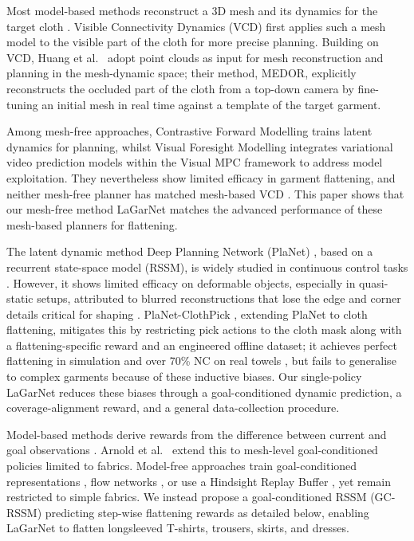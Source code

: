 \documentclass[journal]{IEEEtran}
\newif\ifshowrev\showrevtrue
\newcommand{\rev}[1]{\ifshowrev\textcolor{revblue}{#1}\else#1\fi}
\newif\ifshowirev\showirevtrue
\newcommand{\irev}[1]{\ifshowirev\textcolor{irevgreen}{#1}\else#1\fi}
\begin{document}
\rev{Most model-based methods reconstruct a 3D mesh and its dynamics for the target cloth \cite{huang2022mesh, lin2022learning}. Visible Connectivity Dynamics (VCD) \cite{lin2022learning} first applies such a mesh model to the visible part of the cloth for more precise planning. Building on VCD, Huang et al.~\cite{huang2022mesh} adopt point clouds as input for mesh reconstruction and planning in the mesh-dynamic space; their method, MEDOR, explicitly reconstructs the occluded part of the cloth from a top-down camera by fine-tuning an initial mesh in real time against a template of the target garment.}

\rev{Among mesh-free approaches, Contrastive Forward Modelling \cite{yan2021learning} trains latent dynamics for planning, \irev{whilst} Visual Foresight Modelling \cite{hoque2022visuospatial} integrates variational video prediction models within the Visual MPC framework \cite{ebert2018visual} to address model exploitation. They nevertheless show limited efficacy in garment flattening, and neither mesh-free planner has matched mesh-based VCD \cite{lin2022learning}. \irev{This paper shows that} our mesh-free method LaGarNet matches the advanced performance of these mesh-based planners for flattening.}

\rev{The latent dynamic method Deep Planning Network (PlaNet) \cite{hafner2019learning}, based on a recurrent state-space model (RSSM), is widely studied in continuous control tasks \cite{yan2021learning, ma2021learning, lin2020softgym}. However, it shows limited efficacy on deformable objects, especially in quasi-static setups, attributed to blurred reconstructions that lose the edge and corner details critical for shaping \cite{yan2021learning, lin2022learning}. PlaNet-ClothPick \cite{kadi2024planet}, extending PlaNet to cloth flattening, mitigates this by restricting pick actions to the cloth mask along with a flattening-specific reward and an engineered offline dataset; it achieves perfect flattening in simulation and over 70\% NC on real towels \cite{kadi2024planet, kadi2025draper}, but fails to generalise to complex garments because of these inductive biases. Our single-policy LaGarNet reduces \irev{these biases} through a goal-conditioned dynamic prediction, a coverage-alignment reward, and a general data-collection procedure.}

\rev{Model-based methods derive rewards from the difference between current and goal observations \cite{hoque2022visuospatial, yan2021learning}. Arnold et al.~\cite{arnold2023cloth} extend this to mesh-level goal-conditioned policies limited to fabrics. Model-free approaches train goal-conditioned representations \cite{mo2022foldsformer}, flow networks \cite{weng2022fabricflownet}, or use a Hindsight Replay Buffer \cite{andrychowicz2017hindsight, lee2021learning}, yet remain restricted to simple fabrics. We instead propose a goal-conditioned RSSM (GC-RSSM) predicting step-wise flattening rewards as detailed below, enabling LaGarNet to flatten longsleeved T-shirts, trousers, skirts, and dresses.}
\end{document}
